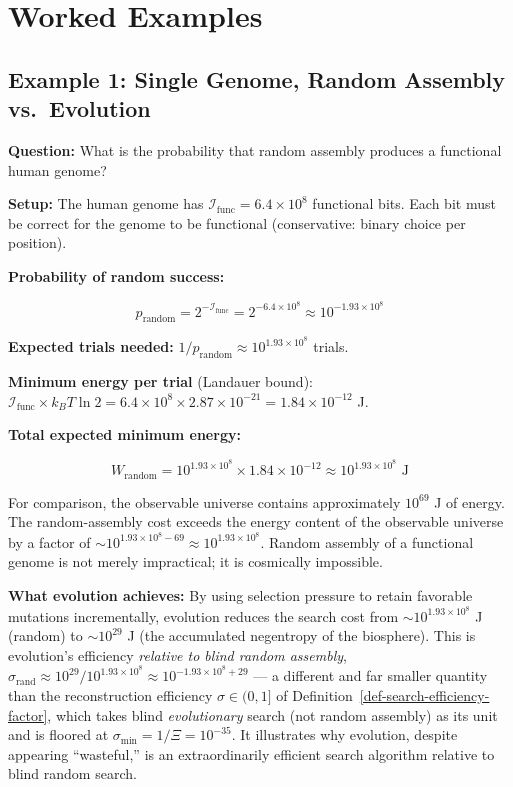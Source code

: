 \documentclass[11pt]{article}
\theoremstyle{plain}
\theoremstyle{definition}
\theoremstyle{remark}
\let\origsection\section
\renewcommand{\section}{\needspace{12\baselineskip}\origsection}
\let\origsubsection\subsection
\renewcommand{\subsection}{\needspace{7\baselineskip}\origsubsection}
\begin{document}
\section{Worked Examples}\label{worked-examples}

\subsection{Example 1: Single Genome, Random Assembly
vs.~Evolution}\label{example-1-single-genome-random-assembly-vs.-evolution}

\textbf{Question:} What is the probability that random assembly produces
a functional human genome?

\textbf{Setup:} The human genome has
\(\mathcal{I}_{\text{func}} = 6.4 \times 10^8\) functional bits. Each
bit must be correct for the genome to be functional (conservative:
binary choice per position).

\textbf{Probability of random success:}

\[p_{\text{random}} = 2^{-\mathcal{I}_{\text{func}}} = 2^{-6.4 \times 10^8} \approx 10^{-1.93 \times 10^8}\]

\textbf{Expected trials needed:}
\(1/p_{\text{random}} \approx 10^{1.93 \times 10^8}\) trials.

\textbf{Minimum energy per trial} (Landauer bound):
\(\mathcal{I}_{\text{func}} \times k_B T \ln 2 = 6.4 \times 10^8 \times 2.87 \times 10^{-21} = 1.84 \times 10^{-12}\)
J.

\textbf{Total expected minimum energy:}

\[W_{\text{random}} = 10^{1.93 \times 10^8} \times 1.84 \times 10^{-12} \approx 10^{1.93 \times 10^8} \text{ J}\]

For comparison, the observable universe contains approximately
\(10^{69}\) J of energy\citep{Penrose2005}. The random-assembly cost
exceeds the energy content of the observable universe by a factor of
\(\sim 10^{1.93 \times 10^8 - 69} \approx 10^{1.93 \times 10^8}\).
Random assembly of a functional genome is not merely impractical; it is
cosmically impossible.

\textbf{What evolution achieves:} By using selection pressure to retain
favorable mutations incrementally, evolution reduces the search cost
from \(\sim 10^{1.93 \times 10^8}\) J (random) to \(\sim 10^{29}\) J
(the accumulated negentropy of the biosphere). This is evolution's
efficiency \emph{relative to blind random assembly},
\(\sigma_{\text{rand}} \approx 10^{29} / 10^{1.93 \times 10^8} \approx 10^{-1.93 \times 10^8 + 29}\)
--- a different and far smaller quantity than the reconstruction
efficiency \(\sigma \in (0,1]\) of
Definition~\ref{def-search-efficiency-factor}, which takes blind
\emph{evolutionary} search (not random assembly) as its unit and is
floored at \(\sigma_{\min} = 1/\Xi = 10^{-35}\). It illustrates why
evolution, despite appearing ``wasteful,'' is an extraordinarily
efficient search algorithm relative to blind random search.
\end{document}
